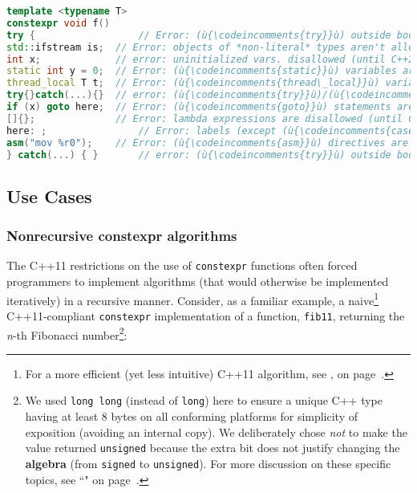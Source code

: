 \begin{lstlisting}[language=C++]
template <typename T>
constexpr void f()
try {                  // Error: (ù{\codeincomments{try}}ù) outside body isn't allowed (until C++20).
std::ifstream is;  // Error: objects of *non-literal* types aren't allowed.
int x;             // error: uninitialized vars. disallowed (until C++20)
static int y = 0;  // Error: (ù{\codeincomments{static}}ù) variables are disallowed.
thread_local T t;  // Error: (ù{\codeincomments{thread\_local}}ù) variables are disallowed.
try{}catch(...){}  // error: (ù{\codeincomments{try}}ù)/(ù{\codeincomments{catch}}ù) disallowed (until C++20)
if (x) goto here;  // Error: (ù{\codeincomments{goto}}ù) statements are disallowed.
[]{};              // Error: lambda expressions are disallowed (until C++17).
here: ;                // Error: labels (except (ù{\codeincomments{case}}ù)/(ù{\codeincomments{default}}ù)) aren't allowed.
asm("mov %r0");    // Error: (ù{\codeincomments{asm}}ù) directives are disallowed.
} catch(...) { }       // error: (ù{\codeincomments{try}}ù) outside body disallowed (until C++20)
\end{lstlisting}


\subsection[Use Cases]{Use Cases}\label{use-cases-relaxedconstexpr}

\subsubsection[Nonrecursive {\tt constexpr} algorithms]{Nonrecursive {\SubsubsecCode constexpr} algorithms}\label{non-recursive-constexpr-algorithms}

The C++11 restrictions on the use of \texttt{constexpr} functions often
forced programmers to implement algorithms (that would otherwise be
implemented iteratively) in a recursive manner. Consider, as a familiar
example, a naive{\cprotect\footnote{For a more efficient (yet less
intuitive) C++11 algorithm, see \textit{, } on page~\pageref{recursive-fibonacci}.}}
C++11-compliant \texttt{constexpr} implementation of a function,
\texttt{fib11}, returning the \emph{n}-th Fibonacci number\footnote{We used \texttt{long}~\texttt{long} (instead of \texttt{long})
here to ensure a unique C++ type having at least 8 bytes on all
conforming platforms for simplicity of exposition (avoiding an internal
copy). We deliberately chose \emph{not} to make the value returned
\texttt{unsigned} because the extra bit does not justify changing the
\textbf{algebra} (from \texttt{signed} to \texttt{unsigned}). For more
discussion on these specific topics, see ``" on page~\pageref{long-long}.}:

